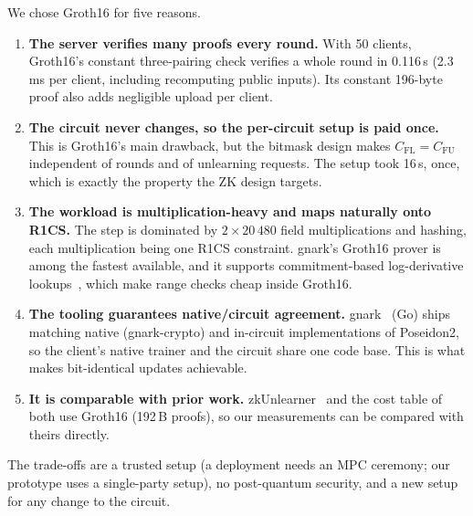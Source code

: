 \documentclass[conference]{IEEEtran}
\begin{document}
We chose Groth16 for five reasons.
\begin{enumerate}
\item \textbf{The server verifies many proofs every round.} With 50 clients, Groth16's constant
three-pairing check verifies a whole round in 0.116\,s (2.3\,ms per client, including recomputing
public inputs). Its constant 196-byte proof also adds negligible upload per client.
\item \textbf{The circuit never changes, so the per-circuit setup is paid once.} This is Groth16's
main drawback, but the bitmask design makes $C_{\text{FL}}=C_{\text{FU}}$ independent of rounds and
of unlearning requests. The setup took 16\,s, once, which is exactly the property the ZK design
targets.
\item \textbf{The workload is multiplication-heavy and maps naturally onto R1CS.} The step is
dominated by $2\times20\,480$ field multiplications and hashing, each multiplication being one R1CS
constraint. gnark's Groth16 prover is among the fastest available, and it supports
commitment-based log-derivative lookups~\cite{habock}, which make range checks cheap inside
Groth16.
\item \textbf{The tooling guarantees native/circuit agreement.} gnark~\cite{gnark} (Go) ships
matching native (gnark-crypto) and in-circuit implementations of Poseidon2, so the client's native
trainer and the circuit share one code base. This is what makes bit-identical updates achievable.
\item \textbf{It is comparable with prior work.} zkUnlearner~\cite{zkunlearner} and the cost table
of~\cite{zkdesign} both use Groth16 (192\,B proofs), so our measurements can be compared with
theirs directly.
\end{enumerate}
The trade-offs are a trusted setup (a deployment needs an MPC ceremony; our prototype uses a
single-party setup), no post-quantum security, and a new setup for any change to the circuit.

\end{document}
